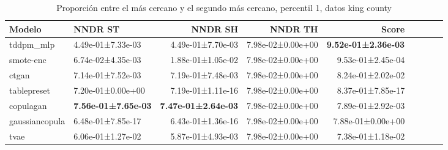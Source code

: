 \begin{table}[H]
\centering
\fontsize{10}{14}\selectfont
\caption{Proporción entre el más cercano y el segundo más cercano, percentil 1, datos king county}
\label{table-dcr-king county-a}
\begin{tabular}{|l|l|r|r|r|r|r|r|r|}
\hline
\rowcolor[gray]{0.8}
Modelo & NNDR ST & NNDR SH & NNDR TH & \textbf{Score} \\
\hline tddpm\_mlp & 4.49e-01±7.33e-03 & 4.49e-01±7.70e-03 & 7.98e-02±0.00e+00 & \bfseries 9.52e-01±2.36e-03 \\
\hline smote-enc & \cellcolor[rgb]{0.9, 0.54, 0.52} 6.74e-02±4.35e-03 & \cellcolor[rgb]{0.9, 0.54, 0.52} 1.88e-01±1.05e-02 & 7.98e-02±0.00e+00 & 9.53e-01±2.45e-04 \\
\hline ctgan & 7.14e-01±7.52e-03 & 7.19e-01±7.48e-03 & 7.98e-02±0.00e+00 & 8.24e-01±2.02e-02 \\
\hline tablepreset & 7.20e-01±0.00e+00 & 7.19e-01±1.11e-16 & 7.98e-02±0.00e+00 & 8.37e-01±7.85e-17 \\
\hline copulagan & \bfseries 7.56e-01±7.65e-03 & \bfseries 7.47e-01±2.64e-03 & 7.98e-02±0.00e+00 & 7.89e-01±2.92e-03 \\
\hline gaussiancopula & 6.48e-01±7.85e-17 & 6.43e-01±1.36e-16 & 7.98e-02±0.00e+00 & 7.88e-01±0.00e+00 \\
\hline tvae & 6.06e-01±1.27e-02 & 5.87e-01±4.93e-03 & 7.98e-02±0.00e+00 & \cellcolor[rgb]{0.9, 0.54, 0.52} 7.38e-01±1.18e-02 \\
\hline
\end{tabular}
\end{table}
